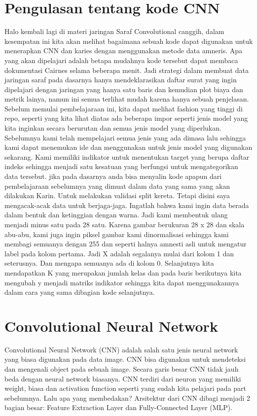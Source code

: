 \section{Pengulasan tentang kode CNN}
Halo kembali lagi di materi jaringan Saraf Convolutional canggih, dalam kesempatan ini kita akan melihat bagaimana sebuah kode dapat digunakan untuk menerapkan CNN dan karies dengan menggunakan metode data amneris. Apa yang akan dipelajari adalah betapa mudahnya kode tersebut dapat membaca dokumentasi Cairnes selama beberapa menit. Jadi strategi dalam membuat data jaringan saraf pada dasarnya hanya mendeklarasikan daftar surat yang ingin dipelajari dengan jaringan yang hanya satu baris dan kemudian plot biaya dan metrik lainya, namun ini semua terlihat mudah karena hanya sebuah penjelasan. Sebelum memulai pembelajaraan ini, kita dapat melihat fashion yang tinggi di repo, seperti yang kita lihat diatas ada beberapa impor seperti jenis model yang kita inginkan secara berurutan dan semua jenis model yang diperlukan. Sebelumnya kami telah mempelajari semua jenis yang ada dimasa lalu sehingga kami dapat menemukan ide dan menggunakan untuk jenis model yang digunakan sekarang. Kami memiliki indikator untuk menentukan target yang berupa daftar indeks sehingga menjadi satu kesatuan yang berfungsi untuk mengategorikan data tersebut. jika pada dasarnya anda bisa menyalin kode apapun dari pembelajaraan sebelumnya yang dimuat dalam data yang sama yang akan dilakukan Karin. Untuk melakukan validasi split kereta. Tetapi disini saya mengacak-acak data untuk berjaga-jaga. Ingatlah bahwa kami ingin data berada dalam bentuk dan ketinggian dengan warna. Jadi kami membentuk ulang menjadi minus satu pada 28 satu. Karena gambar berukuran 28 x 28 dan skala abu-abu, kami juga ingin piksel gambar kami dinormalisasi sehingga kami membagi semuanya dengan 255 dan seperti halnya amnesti asli untuk mengatur label pada kolom pertama. Jadi X adalah segalanya mulai dari kolom 1 dan seterusnya. Dan mengapa semuanya ada di kolom 0. Selanjutnya kita mendapatkan K yang merupakan jumlah kelas dan pada baris berikutnya kita mengubah y menjadi matriks indikator sehingga kita dapat menggunakannya dalam cara yang sama dibagian kode selanjutnya.


\section{Convolutional Neural Network}
Convolutional Neural Network (CNN) adalah salah satu jenis neural network yang biasa digunakan pada data image. CNN bisa digunakan untuk mendeteksi dan mengenali object pada sebuah image.
Secara garis besar CNN tidak jauh beda dengan neural network biasanya. CNN terdiri dari neuron yang memiliki weight, biasa dan activation function seperti yang sudah kita pelajari pada part sebelumnya. Lalu apa yang membedakan? Arsitektur dari CNN dibagi menjadi 2 bagian besar:
Feature Extraction Layer dan Fully-Connected Layer (MLP).

